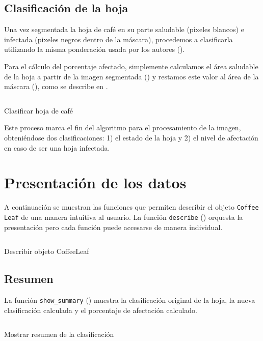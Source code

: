 \subsection{Clasificación de la hoja}
Una vez segmentada la hoja de café en su parte saludable (pixeles blancos) e infectada (pixeles negros dentro de la máscara), procedemos a clasificarla utilizando la misma ponderación usada por los autores ().

Para el cálculo del porcentaje afectado, simplemente calculamos el área saludable de la hoja a partir de la imagen segmentada () y restamos este valor al área de la máscara (), como se describe en .

\begin{listing}[H]
\inputminted{python}{code_listings/categorize.py}
\caption{Clasificar hoja de café}
\label{code:categorize}
\end{listing}

Este proceso marca el fin del algoritmo para el procesamiento de la imagen, obteniéndose dos clasificaciones: 1) el estado de la hoja y 2) el nivel de afectación en caso de ser una hoja infectada.

\section{Presentación de los datos}
A continuación se muestran las funciones que permiten describir el objeto \texttt{Coffee Leaf} de una manera intuitiva al usuario. La función \texttt{describe} () orquesta la presentación pero cada función puede accesarse de manera individual.

\begin{listing}[H]
\inputminted{python}{code_listings/describe.py}
\caption{Describir objeto CoffeeLeaf}
\label{code:describe}
\end{listing}

\subsection{Resumen}
La función \texttt{show\_summary} () muestra la clasificación original de la hoja, la nueva clasificación calculada y el porcentaje de afectación calculado.

\begin{listing}[H]
\inputminted{python}{code_listings/show_summary.py}
\caption{Mostrar resumen de la clasificación}
\label{code:show_summary}
\end{listing}

